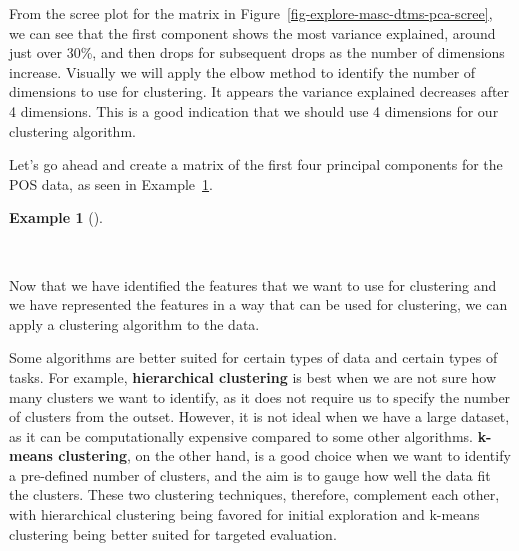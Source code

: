 \documentclass[
  letterpaper,
  krantz1]{latex/krantz-mod}
\newenvironment{Shaded}{\begin{snugshade}}{\end{snugshade}}
\newcommand{\CommentTok}[1]{\textcolor[rgb]{0.00,0.00,0.00}{\textit{#1}}}
\newcommand{\DecValTok}[1]{\textcolor[rgb]{0.00,0.00,0.00}{#1}}
\newcommand{\NormalTok}[1]{\textcolor[rgb]{0.00,0.00,0.00}{#1}}
\newcommand{\OtherTok}[1]{\textcolor[rgb]{0.00,0.00,0.00}{#1}}
\newcommand{\SpecialCharTok}[1]{\textcolor[rgb]{0.00,0.00,0.00}{#1}}
\theoremstyle{definition}
\theoremstyle{definition}
\newtheorem{example}{Example}[chapter]
\theoremstyle{remark}
\begin{document}
From the scree plot for the matrix in
Figure~\ref{fig-explore-masc-dtms-pca-scree}, we can see that the first
component shows the most variance explained, around just over 30\%, and
then drops for subsequent drops as the number of dimensions increase.
Visually we will apply the elbow method to identify
the number of dimensions to use for clustering. It
appears the variance explained decreases after 4 dimensions. This is a
good indication that we should use 4 dimensions for our clustering
algorithm.

Let's go ahead and create a matrix of the first four principal
components for the POS data, as seen in
Example~\ref{exm-explore-masc-pos-pca-pc}.

\begin{example}[]\protect\hypertarget{exm-explore-masc-pos-pca-pc}{}\label{exm-explore-masc-pos-pca-pc}

~

\begin{Shaded}
\end{Shaded}

\end{example}

Now that we have identified the features that we want to use for
clustering and we have represented the features in a way that can be
used for clustering, we can apply a clustering algorithm to the data.

Some algorithms are better suited for certain types of data and certain
types of tasks. For example, \textbf{hierarchical
clustering} is best when we are not sure
how many clusters we want to identify, as it does not require us to
specify the number of clusters from the outset. However, it is not ideal
when we have a large dataset, as it can be computationally expensive
compared to some other algorithms. \textbf{k-means
clustering}, on the other hand, is a good
choice when we want to identify a pre-defined number of clusters, and
the aim is to gauge how well the data fit the clusters. These two
clustering techniques, therefore, complement each other, with
hierarchical clustering being favored for initial exploration and
k-means clustering being better suited for targeted evaluation.
\end{document}
